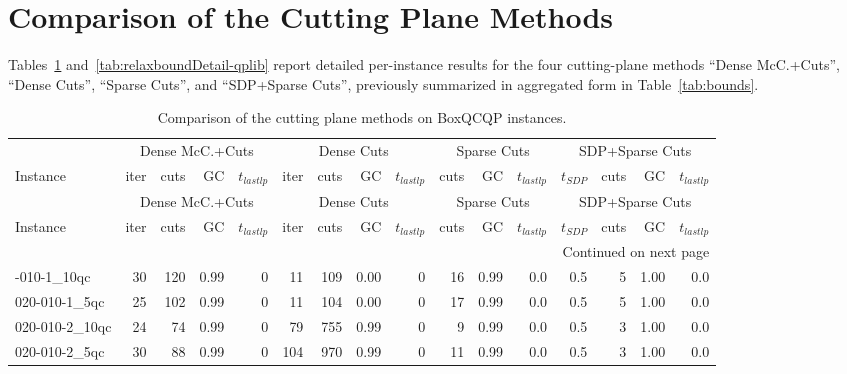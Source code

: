 \documentclass[twoside]{article}
\begin{document}
	
	
	
\newpage	\section{Comparison of the Cutting Plane Methods}
	\label{app:relaxboundDetails}
	
	Tables~\ref{tab:relaxboundDetail-boxqp} and~\ref{tab:relaxboundDetail-qplib} report detailed per-instance results for the four cutting-plane methods ``Dense McC.+Cuts'', ``Dense Cuts'', ``Sparse Cuts'', and ``SDP+Sparse Cuts'', previously summarized in aggregated form in Table~\ref{tab:bounds}.
	
	\begingroup
	\fontsize{7pt}{8pt}\selectfont
	\setlength{\tabcolsep}{1pt} %
	
	\begin{longtable}{l|rrrr|rrrr|rrr|rrrr}
		\caption{Comparison of the cutting plane methods on BoxQCQP instances.}\label{tab:relaxboundDetail-boxqp} \\
		\toprule
		& \multicolumn{4}{c|}{Dense McC.+Cuts} & \multicolumn{4}{c|}{Dense Cuts} & \multicolumn{3}{c|}{Sparse Cuts} & \multicolumn{4}{c}{SDP+Sparse Cuts} \\
		Instance & iter & cuts & GC & $t_{lastlp}$ & iter & cuts & GC & $t_{lastlp}$ & cuts & GC & $t_{lastlp}$ & $t_{SDP}$ & cuts & GC & $t_{lastlp}$ \\
		\midrule
		\endfirsthead
		\toprule
		& \multicolumn{4}{c|}{Dense McC.+Cuts} & \multicolumn{4}{c|}{Dense Cuts} & \multicolumn{3}{c|}{Sparse Cuts} & \multicolumn{4}{c}{SDP+Sparse Cuts} \\
		Instance & iter & cuts & GC & $t_{lastlp}$ & iter & cuts & GC & $t_{lastlp}$ & cuts & GC & $t_{lastlp}$ & $t_{SDP}$ & cuts & GC & $t_{lastlp}$ \\
		\midrule
		\endhead
		\midrule
		\multicolumn{16}{r}{Continued on next page} \\
		\midrule
		\endfoot
		\bottomrule
		\endlastfoot
		020-010-1\_10qc & 30 & 120 & 0.99 & 0 & 11 & 109 & 0.00 & 0 & 16 & 0.99 & 0.0 & 0.5 & 5 & 1.00 & 0.0 \\
		020-010-1\_5qc & 25 & 102 & 0.99 & 0 & 11 & 104 & 0.00 & 0 & 17 & 0.99 & 0.0 & 0.5 & 5 & 1.00 & 0.0 \\
		020-010-2\_10qc & 24 & 74 & 0.99 & 0 & 79 & 755 & 0.99 & 0 & 9 & 0.99 & 0.0 & 0.5 & 3 & 1.00 & 0.0 \\
		020-010-2\_5qc & 30 & 88 & 0.99 & 0 & 104 & 970 & 0.99 & 0 & 11 & 0.99 & 0.0 & 0.5 & 3 & 1.00 & 0.0 \\

\end{longtable}
\end{document}

